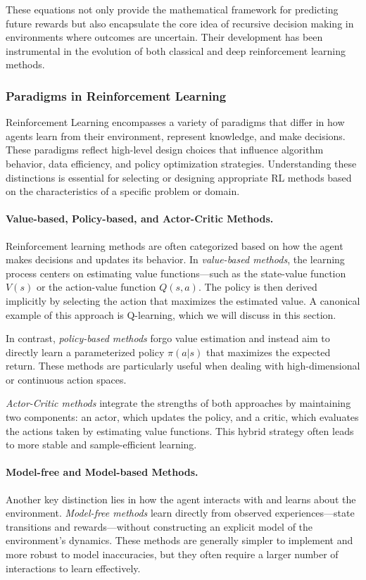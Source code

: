 \documentclass[12pt,a4paper,twoside,openany]{book}
\begin{document}
These equations not only provide the mathematical framework for predicting future rewards but also encapsulate the core idea of recursive decision making in environments where outcomes are uncertain. Their development has been instrumental in the evolution of both classical and deep reinforcement learning methods.

\subsubsection*{Paradigms in Reinforcement Learning}

Reinforcement Learning encompasses a variety of paradigms that differ in how agents learn from their environment, represent knowledge, and make decisions. These paradigms reflect high-level design choices that influence algorithm behavior, data efficiency, and policy optimization strategies. Understanding these distinctions is essential for selecting or designing appropriate RL methods based on the characteristics of a specific problem or domain.

\paragraph{Value-based, Policy-based, and Actor-Critic Methods.}
Reinforcement learning methods are often categorized based on how the agent makes decisions and updates its behavior. In \emph{value-based methods}, the learning process centers on estimating value functions—such as the state-value function \(V(s)\) or the action-value function \(Q(s,a)\). The policy is then derived implicitly by selecting the action that maximizes the estimated value. A canonical example of this approach is Q-learning, which we will discuss in this section.

In contrast, \emph{policy-based methods} forgo value estimation and instead aim to directly learn a parameterized policy \(\pi(a|s)\) that maximizes the expected return. These methods are particularly useful when dealing with high-dimensional or continuous action spaces.

\emph{Actor-Critic methods} integrate the strengths of both approaches by maintaining two components: an actor, which updates the policy, and a critic, which evaluates the actions taken by estimating value functions. This hybrid strategy often leads to more stable and sample-efficient learning.

\medskip
\paragraph{Model-free and Model-based Methods.}
Another key distinction lies in how the agent interacts with and learns about the environment. \emph{Model-free methods} learn directly from observed experiences—state transitions and rewards—without constructing an explicit model of the environment's dynamics. These methods are generally simpler to implement and more robust to model inaccuracies, but they often require a larger number of interactions to learn effectively.
\end{document}

